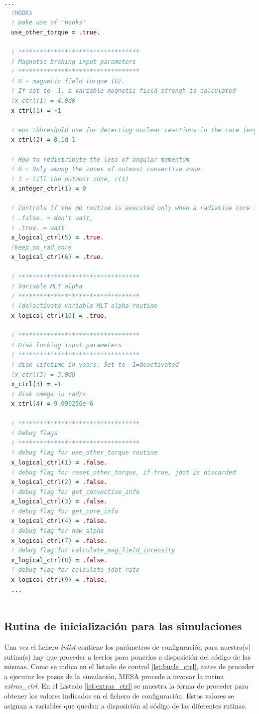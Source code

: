 \begin{lstlisting}[language=Fortran, float, caption={Parámetros de configuración para las rutinas incorporadas al simulador MESA.}, label={lst:config_inlist}]
  ...
  !HOOKs
  ! make use of 'hooks'
  use_other_torque = .true.

  ! **********************************
  ! Magnetic braking input parameters
  ! **********************************
  ! B - magnetic field torque (G).
  ! If set to -1, a variable magnetic field strengh is calculated
  !x_ctrl(1) = 4.0d0  
  x_ctrl(1) = -1 
  
  ! eps thhreshold use for detecting nuclear reactions in the core (erg/g/s)
  x_ctrl(2) = 0.1d-1 

  ! How to redistribute the loss of angular momentum
  ! 0 = Only among the zones of outmost convective zone
  ! 1 = till the outmost zone, r(1)
  x_integer_ctrl(1) = 0 

  ! Controls if the mb routine is executed only when a radiative core is develop
  ! .false. = don't wait, 
  ! .true. = wait
  x_logical_ctrl(5) = .true.
  !keep_on_rad_core
  x_logical_ctrl(6) = .true.  

  ! **********************************
  ! Variable MLT alpha
  ! **********************************
  ! (de)activate variable MLT alpha routine
  x_logical_ctrl(10) = .true.
  
  ! **********************************
  ! Disk locking input parameters
  ! **********************************
  ! disk lifetime in years. Set to -1=deactivated
  !x_ctrl(3) = 3.0d6 
  x_ctrl(3) = -1
  ! disk omega in rad/s
  x_ctrl(4) = 9.090256e-6 
  
  ! **********************************
  ! Debug flags
  ! **********************************
  ! debug flag for use_other_torque routine
  x_logical_ctrl(1) = .false. 
  ! debug flag for reset_other_torque, if true, jdot is discarded
  x_logical_ctrl(2) = .false.
  ! debug flag for get_convective_info
  x_logical_ctrl(3) = .false. 
  ! debug flag for get_core_info
  x_logical_ctrl(4) = .false.  
  ! debug flag for new_alpha
  x_logical_ctrl(7) = .false.  
  ! debug flag for calculate_mag_field_intensity
  x_logical_ctrl(8) = .false.
  ! debug flag for calculate_jdot_rate  
  x_logical_ctrl(9) = .false.  
  ...
    
\end{lstlisting}


\subsection{Rutina de inicialización para las simulaciones}
Una vez el fichero \textit{inlist} contiene los parámetros de configuración para nuestra(s) rutina(s) hay que proceder a leerlos para ponerlos a disposición del código de las mismas. Como se indica en el listado de control \ref{lst:bucle_ctrl}, antes de proceder a ejecutar los pasos de la simulación, MESA procede a invocar la rutina \textit{extras\_ctrl}. En el Listado \ref{lst:extras_ctrl} se muestra la forma de proceder para obtener los valores indicados en el fichero de configuración. Estos valores se asignan a variables que quedan a disposición al código de las diferentes rutinas.

